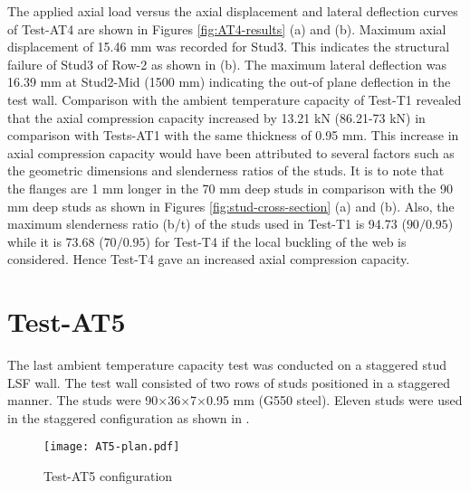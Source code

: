 The applied axial load versus the axial displacement and lateral deflection curves of Test-AT4 are shown in Figures \ref{fig:AT4-results} (a) and (b). Maximum axial displacement of 15.46 mm was recorded for Stud3. This indicates the structural failure of Stud3 of Row-2 as shown in  (b). The maximum lateral deflection was 16.39 mm at Stud2-Mid (1500 mm) indicating the out-of plane deflection in the test wall. Comparison with the ambient temperature capacity of Test-T1 revealed that the axial compression capacity increased by 13.21 kN (86.21-73 kN) in comparison with Tests-AT1 with the same thickness of 0.95 mm. This increase in axial compression capacity would have been attributed to several factors such as the geometric dimensions and slenderness ratios of the studs. It is to note that the flanges are 1 mm longer in the 70 mm deep studs in comparison with the 90 mm deep studs as shown in Figures \ref{fig:stud-cross-section} (a) and (b). Also, the maximum slenderness ratio (b/t) of the studs used in Test-T1 is 94.73 ($90/0.95$) while it is 73.68 ($70/0.95$) for Test-T4 if the local buckling of the web is considered. Hence Test-T4 gave an increased axial compression capacity. 

\section{Test-AT5}

The last ambient temperature capacity test was conducted on a staggered stud LSF wall. The test wall consisted of two rows of studs positioned in a staggered manner. The studs were 90$\times$36$\times$7$\times$0.95 mm (G550 steel). Eleven studs were used in the staggered configuration as shown in . 
\begin{figure}[!htbp]
	\centering
			\texttt{[image: AT5-plan.pdf]}\\
		\caption{Test-AT5 configuration}
		\label{fig:AT5-plan}
\end{figure}

